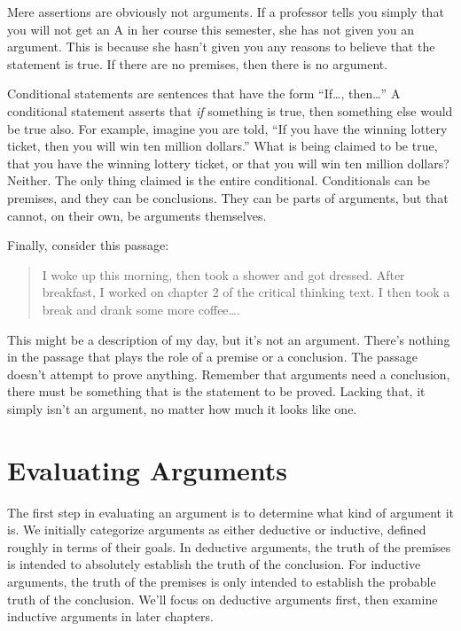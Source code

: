 Mere assertions are obviously not arguments. If a professor tells you simply that you will not get an A in her course this semester, she has not given you an argument. This is because she hasn't given you any reasons to believe that the statement is true. If there are no premises, then there is no argument.

Conditional statements are sentences that have the form \enquote{If\ldots, then\ldots} A conditional statement asserts that \emph{if} something is true, then something else would be true also. For example, imagine you are told, \enquote{If you have the winning lottery ticket, then you will win ten million dollars.} What is being claimed to be true, that you have the winning lottery ticket, or that you will win ten million dollars? Neither. The only thing claimed is the entire conditional. Conditionals can be premises, and they can be conclusions. They can be parts of arguments, but that cannot, on their own, be arguments themselves.

Finally, consider this passage:

\begin{quote}
I woke up this morning, then took a shower and got dressed. After breakfast, I worked on chapter 2 of the critical thinking text. I then took a break and drank some more coffee\ldots.
\end{quote}

This might be a description of my day, but it's not an argument. There's nothing in the passage that plays the role of a premise or a conclusion. The passage doesn't attempt to prove anything. Remember that arguments need a conclusion, there must be something that is the statement to be proved. Lacking that, it simply isn't an argument, no matter how much it looks like one.

\section{Evaluating Arguments}
\label{sec:evaluating-arguments}

The first step in evaluating an argument is to determine what kind of argument it is. We initially categorize arguments as either deductive or inductive, defined roughly in terms of their goals. In deductive arguments, the truth of the premises is intended to absolutely establish the truth of the conclusion. For inductive arguments, the truth of the premises is only intended to establish the probable truth of the conclusion. We'll focus on deductive arguments first, then examine inductive arguments in later chapters.

